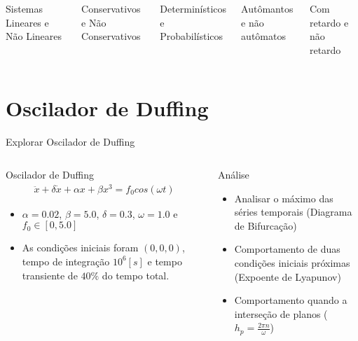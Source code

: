 \documentclass[12pt,aspectratio=169]{beamer}
\begin{document}
\begin{frame}
\begin{columns}
\begin{block}{}
Sistemas Lineares e Não Lineares
\end{block}
\begin{block}{}
Conservativos e Não Conservativos
\end{block}
\begin{block}{}
Determinísticos e Probabilísticos
\end{block}
\begin{block}{}
Autômantos e não autômatos
\end{block}
\begin{block}{}
Com retardo e não retardo
\end{block}
\end{columns}
\end{frame}





\section{Oscilador de Duffing}
\begin{frame}{Explorar Oscilador de Duffing }
\begin{columns}
\begin{block}{Oscilador de Duffing}
\begin{eqnarray}
\ddot{x}+\delta\dot{x}+\alpha x+\beta x^3 = f_0cos(\omega t)
\end{eqnarray}
\begin{itemize}
    \item $\alpha =0.02$, $\beta=5.0$, $\delta=0.3$, $\omega=1.0$ e $f_0 \in [0,5.0]$
    \item As condições iniciais foram $(0,0,0)$, tempo de integração $10^6[s]$ e tempo transiente de $40\%$ do tempo total.
\end{itemize}
\end{block}
\begin{block}{Análise}
\begin{itemize}
    \item Analisar o máximo das séries temporais (Diagrama de Bifurcação) 
    \item Comportamento de duas condições iniciais próximas (Expoente de Lyapunov)
    \item Comportamento quando a interseção de planos ($h_p=\frac{2\pi n}{\omega}$) 
\end{itemize}
\end{block}
\end{columns}
\end{frame}
\end{document}
